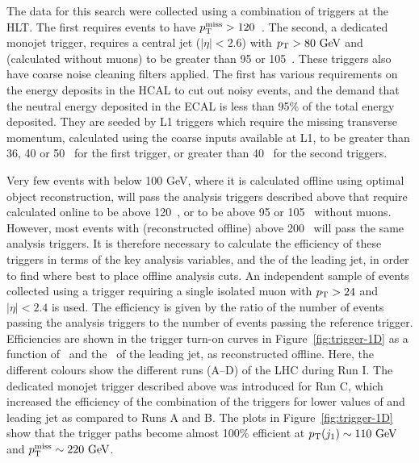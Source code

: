 The data for this search were collected using a combination of  triggers at the \ac{HLT}. 
The first requires events to have $p_{\text{T}}^{\text{miss}}>120$~\GeV.
The second, a dedicated monojet trigger, requires a central jet ($|\eta|<2.6$) with $p_{\text{T}}>80~\mathrm{GeV}$ and \MET 
(calculated without muons) to be greater than 95 or 105~\GeV. 
These triggers also have coarse noise cleaning filters applied. 
The first  has various requirements on the energy deposits in the \ac{HCAL} to cut out noisy events, 
and the  demand that the neutral energy deposited in the \ac{ECAL} is less than 95\% of the total energy deposited.
They are seeded by \ac{L1} triggers which require the missing transverse momentum, calculated using the coarse inputs available at \ac{L1}, to be greater than 36, 40 or 50~\GeV{} for the first trigger, or greater than 40~\GeV{} for the second  triggers. 


Very few events with \MET{} below 100 GeV, where it is calculated offline using optimal object reconstruction,  will pass the analysis triggers described above that require \MET calculated online to be above 120~\GeV, or to be above 95 or 105~\GeV{} without muons. 
However, most events with \MET (reconstructed offline) above 200~\GeV{} will pass the same analysis triggers. 
It is therefore necessary to calculate the efficiency of these triggers in terms of the key analysis variables, \MET and the \pt of the leading jet, in order to find where best to place offline analysis cuts. 
An independent sample of events collected using a trigger requiring a single isolated muon with $p_{\text{T}} > 24$ and $|\eta|<2.4$ is used.
The efficiency is given by the ratio of the number of events passing the analysis triggers to the number of events passing the reference trigger. 
Efficiencies are shown in the trigger turn-on curves in Figure~\ref{fig:trigger-1D} as a function of \MET\ and the \pt\ of the leading jet, as reconstructed offline. 
Here, the different colours show the different runs (A--D) of the \ac{LHC} during Run I.
The dedicated monojet trigger described above was introduced for Run C, which increased the efficiency of the combination of the triggers for lower values of \MET and leading jet \pt as compared to Runs A and B. 
The plots in Figure~\ref{fig:trigger-1D} show that the trigger paths become almost 100\% efficient at $p_{\text{T}}(j_{1})\sim110~\mathrm{GeV}$ and $p_{\text{T}}^{\text{miss}}\sim220~\mathrm{GeV}$. 

